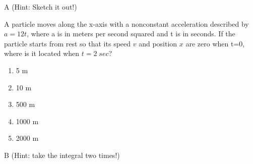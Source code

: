 \begin{solution}
A (Hint: Sketch it out!)
\end{solution}


\begin{question}
A particle moves along the x-axis with a nonconstant acceleration described by $a=12t$, where a is in meters per second squared and t is in seconds. If the particle starts from rest so that its speed $v$ and position $x$ are zero when t=0, where is it located when $t=2\;sec$?
\begin{multicols}{5}
\begin{enumerate}
    \item 5 m
    \item 10 m
    \item 500 m
    \item 1000 m
    \item 2000 m
\end{enumerate}
\end{multicols}
\end{question}

\begin{solution}
B (Hint: take the integral two times!)
\end{solution}

